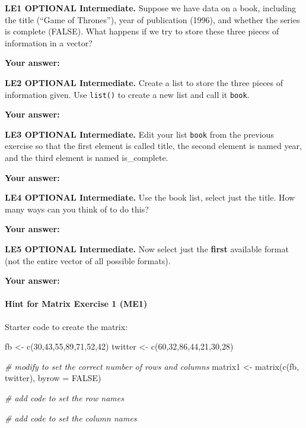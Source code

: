 \documentclass[
]{article}
\newenvironment{Shaded}{\begin{snugshade}}{\end{snugshade}}
\newcommand{\AttributeTok}[1]{\textcolor[rgb]{0.77,0.63,0.00}{#1}}
\newcommand{\CommentTok}[1]{\textcolor[rgb]{0.56,0.35,0.01}{\textit{#1}}}
\newcommand{\ConstantTok}[1]{\textcolor[rgb]{0.00,0.00,0.00}{#1}}
\newcommand{\DecValTok}[1]{\textcolor[rgb]{0.00,0.00,0.81}{#1}}
\newcommand{\FunctionTok}[1]{\textcolor[rgb]{0.00,0.00,0.00}{#1}}
\newcommand{\NormalTok}[1]{#1}
\newcommand{\OtherTok}[1]{\textcolor[rgb]{0.56,0.35,0.01}{#1}}
\begin{document}
\textbf{LE1 OPTIONAL Intermediate.} Suppose we have data on a book,
including the title (``Game of Thrones''), year of publication (1996),
and whether the series is complete (FALSE). What happens if we try to
store these three pieces of information in a vector?

\textbf{Your answer:}

\textbf{LE2 OPTIONAL Intermediate.} Create a list to store the three
pieces of information given. Use \texttt{list()} to create a new list
and call it \texttt{book}.

\textbf{Your answer:}

\textbf{LE3 OPTIONAL Intermediate.} Edit your list \texttt{book} from
the previous exercise so that the first element is called title, the
second element is named year, and the third element is named
is\_complete.

\textbf{Your answer:}

\textbf{LE4 OPTIONAL Intermediate.} Use the book list, select just the
title. How many ways can you think of to do this?

\textbf{Your answer:}

\textbf{LE5 OPTIONAL Intermediate.} Now select just the \textbf{first}
available format (not the entire vector of all possible formats).

\textbf{Your answer:}

\hypertarget{hint-for-matrix-exercise-1-me1}{%
\paragraph{Hint for Matrix Exercise 1
(ME1)}\label{hint-for-matrix-exercise-1-me1}}

Starter code to create the matrix:

\begin{Shaded}
\begin{Highlighting}[]
\NormalTok{fb }\OtherTok{\textless{}{-}} \FunctionTok{c}\NormalTok{(}\DecValTok{30}\NormalTok{,}\DecValTok{43}\NormalTok{,}\DecValTok{55}\NormalTok{,}\DecValTok{89}\NormalTok{,}\DecValTok{71}\NormalTok{,}\DecValTok{52}\NormalTok{,}\DecValTok{42}\NormalTok{)}
\NormalTok{twitter }\OtherTok{\textless{}{-}} \FunctionTok{c}\NormalTok{(}\DecValTok{60}\NormalTok{,}\DecValTok{32}\NormalTok{,}\DecValTok{86}\NormalTok{,}\DecValTok{44}\NormalTok{,}\DecValTok{21}\NormalTok{,}\DecValTok{30}\NormalTok{,}\DecValTok{28}\NormalTok{)}

\CommentTok{\# modify to set the correct number of rows and columns}
\NormalTok{matrix1 }\OtherTok{\textless{}{-}} \FunctionTok{matrix}\NormalTok{(}\FunctionTok{c}\NormalTok{(fb, twitter), }\AttributeTok{byrow =} \ConstantTok{FALSE}\NormalTok{)}

\CommentTok{\# add code to set the row names}

\CommentTok{\# add code to set the column names}
\end{Highlighting}
\end{Shaded}
\end{document}
